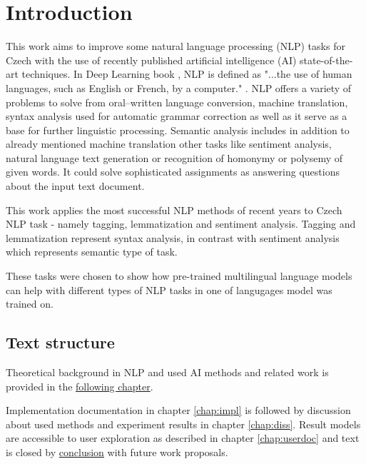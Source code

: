 \chapter*{Introduction}

This work aims to improve some natural language processing (NLP) tasks for Czech %
 with the use of recently published artificial intelligence (AI) state-of-the-art techniques. In Deep Learning book %
, NLP is defined as "...the use of human languages, such as English or French, by a computer." \cite[]{Goodfellow-et-al-2016}. NLP offers a variety of problems to solve from oral--written language conversion, machine translation, syntax analysis used for automatic grammar correction as well as it serve as a base for further linguistic processing. Semantic analysis includes in addition to already mentioned machine translation other tasks like sentiment analysis, natural language text generation or recognition of homonymy or polysemy of given words. It could solve sophisticated assignments as answering questions about the input text document.

This work applies the most successful NLP methods of recent years to Czech NLP task - namely tagging, lemmatization and sentiment analysis. Tagging and lemmatization represent syntax analysis, in contrast with sentiment analysis which represents semantic type of task. %

These tasks were chosen to show how pre-trained multilingual language models can help with different types of NLP tasks in one of langugages model was trained on. 

\section*{Text structure}
Theoretical background in NLP and used AI methods and related work is provided in the \hyperref[chap:theandme]{following chapter}.

Implementation documentation in chapter \ref{chap:impl} is followed by discussion about used methods and experiment results in chapter \ref{chap:diss}. Result models are accessible to user exploration as described in chapter \ref{chap:userdoc} and text is closed by \hyperref[chap:concl]{conclusion} with future work proposals.


